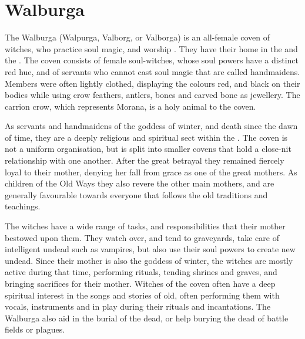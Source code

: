 \clearpage
{}
\clearpage

\section{Walburga}
\label{sec:Walburga}

The Walburga (Walpurga, Valborg, or Valborga) is an all-female coven of
witches, who practice soul magic, and worship . They have
their home in the  and the
. The coven consists of female soul-witches, whose soul
powers have a distinct red hue, and of servants who cannot cast soul magic
that are called handmaidens. Members were often lightly clothed, displaying
the colours red, and black on their bodies while using crow feathers, antlers,
bones and carved bone as jewellery. The carrion crow, which represents Morana,
is a holy animal to the coven.

As servants and handmaidens of the goddess of winter, and death since the dawn
of time, they are a deeply religious and spiritual sect within the
. The coven is not a uniform organisation, but is
split into smaller covens that hold a close-nit relationship with one another.
After the great betrayal they remained fiercely loyal to their mother, denying
her fall from grace as one of the great mothers. As children of the Old Ways
they also revere the other main mothers, and are generally favourable towards
everyone that follows the old traditions and teachings.

The witches have a wide range of tasks, and responsibilities that their mother
bestowed upon them. They watch over, and tend to graveyards, take care of
intelligent undead such as vampires, but also use their soul powers to create
new undead. Since their mother is also the goddess of winter, the witches are
mostly active during that time, performing rituals, tending shrines and graves,
and bringing sacrifices for their mother. Witches of the coven often have a
deep spiritual interest in the songs and stories of old, often performing them
with vocals, instruments and in play during their rituals and incantations.
The Walburga also aid in the burial of the dead, or help burying the dead of
battle fields or plagues.

